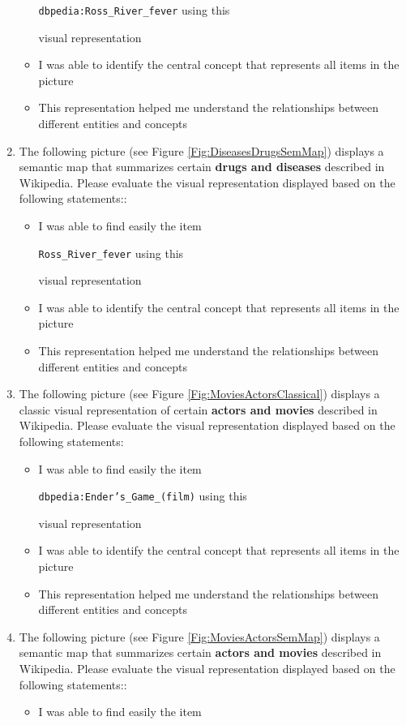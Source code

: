 \documentclass{ieeeaccess}
\begin{document}
\begin{enumerate}
\begin{itemize}
        \texttt{dbpedia:Ross\_River\_fever} using this 
        
        visual representation
        \item I was able to identify the central concept that represents all items in the picture
        \item This representation helped me understand the relationships between different entities and concepts
    \end{itemize}
    \item The following picture (see Figure \ref{Fig:DiseasesDrugsSemMap})
    displays a semantic map that summarizes 
    certain \textbf{drugs and diseases} 
    described in Wikipedia. Please evaluate the visual representation displayed based on the 
    following statements::
    \begin{itemize}
        \item I was able to find easily the item
        
        \texttt{Ross\_River\_fever} using this 
        
        visual representation
        \item I was able to identify the central concept that represents all items in the picture
        \item This representation helped me understand the relationships between different entities and concepts
    \end{itemize}
    \item The following picture (see Figure \ref{Fig:MoviesActorsClassical})
    displays a classic visual representation of 
    certain \textbf{actors and movies} 
    described in Wikipedia. Please evaluate the 
    visual representation displayed based on the 
    following statements:
    \begin{itemize}
        \item I was able to find easily the item
        
        \texttt{dbpedia:Ender's\_Game\_(film)} using this 
        
        visual representation
        \item I was able to identify the central concept that represents all items in the picture
        \item This representation helped me understand the relationships between different entities and concepts
    \end{itemize}
    \item The following picture (see Figure \ref{Fig:MoviesActorsSemMap})
    displays a semantic map that summarizes 
    certain \textbf{actors and movies} 
    described in Wikipedia. Please evaluate the visual representation displayed based on the 
    following statements::
    \begin{itemize}
        \item I was able to find easily the item
        

\end{itemize}
\end{enumerate}
\end{document}
